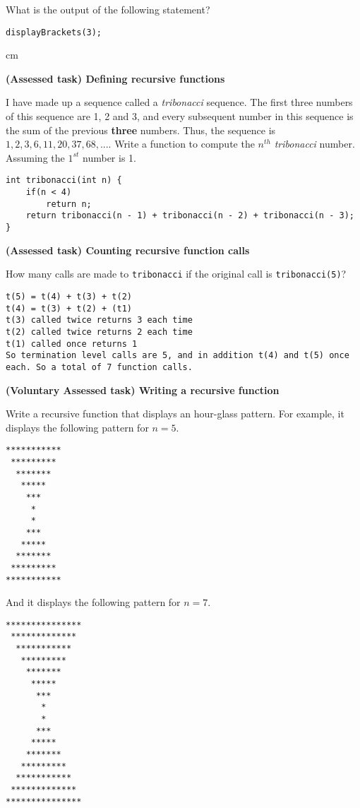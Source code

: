 \begin{questions}
What is the output of the following statement?

\begin{lstlisting}	
displayBrackets(3);
\end{lstlisting}
	
 cm

\question  \textbf{(Assessed task) Defining recursive functions} \vskip 0.5cm

I have made up a sequence called a \emph{tribonacci} sequence. 
The first three numbers of this sequence are 1, 2 and 3, and every subsequent number in this sequence is the sum of the previous \textbf{three} numbers. Thus, the sequence is $1, 2, 3, 6, 11, 20, 37, 68, ...$. Write a function to compute the $n^{th}$ \emph{tribonacci} number. Assuming the $1^{st}$ number is 1.

\begin{solution}
\begin{lstlisting}
int tribonacci(int n) {
	if(n < 4)
		return n;
	return tribonacci(n - 1) + tribonacci(n - 2) + tribonacci(n - 3);
}
\end{lstlisting}	
\end{solution}

\question  \textbf{(Assessed task) Counting recursive function calls} \vskip 0.5cm

How many calls are made to \texttt{tribonacci} if the original call is \texttt{tribonacci(5)}?

\begin{solution}
\begin{verbatim}
t(5) = t(4) + t(3) + t(2)
t(4) = t(3) + t(2) + (t1)
t(3) called twice returns 3 each time
t(2) called twice returns 2 each time
t(1) called once returns 1
So termination level calls are 5, and in addition t(4) and t(5) once each. So a total of 7 function calls.
\end{verbatim}
\end{solution}

\question  \textbf{(Voluntary Assessed task) Writing a recursive function} \vskip 0.5cm

Write a recursive function that displays an hour-glass pattern. For example, it displays the following pattern for $n = 5$.

\begin{verbatim}
***********
 *********
  *******
   *****
    ***
     *
     *
    ***
   *****
  *******
 *********
***********
\end{verbatim}

And it displays the following pattern for $n = 7$.

\begin{verbatim}
***************
 *************
  ***********
   *********
    *******
     *****	
      ***
       *
       *
      ***
     *****
    *******
   *********
  ***********
 *************
***************
\end{verbatim}



\end{questions}

